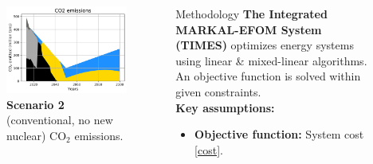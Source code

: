 \documentclass[final]{beamer}
\newlength{\onecolwid}
\newlength{\twocolwid}
\newlength{\threecolwid}
\begin{document}
\begin{frame}[t]
\begin{columns}[t,totalwidth=\threecolwid]
\begin{column}{\twocolwid}
\begin{columns}[t,totalwidth=\twocolwid]
\begin{column}{\onecolwid}
\begin{figure}[H] 
\centering
\includegraphics[scale=1.51]{conv_nonuc_co2}
\caption{\textbf{Scenario 2} (conventional, no new nuclear) CO$_2$ emissions.}
\label{s2c}
\end{figure}


\end{column} %


\begin{column}{\onecolwid} %
\begin{block}{Methodology}
        \textbf{The Integrated MARKAL-EFOM System (TIMES)} 
        \cite{loulou_documentation_2005} 
        \cite{seebregts_energy/environmental_2002} optimizes energy systems 
        using linear \& mixed-linear algorithms. An objective 
        function is solved within given constraints.\\
\textbf{Key assumptions:}
\begin{itemize}
        \item\textbf{Objective function:} System cost \ref{cost}. 
        

\end{itemize}
\end{block}
\end{column}
\end{columns}
\end{column}
\end{columns}
\end{frame}
\end{document}
